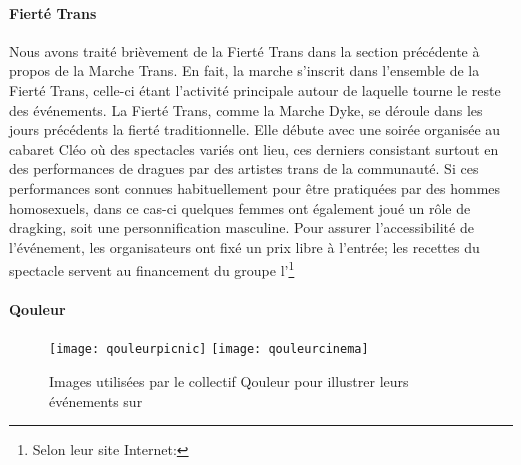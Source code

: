 \paragraph{Fierté Trans}
\label{subsec:fiertetrans}
Nous avons traité brièvement de la Fierté Trans dans la section précédente à propos de la Marche Trans.
En fait, la marche s'inscrit dans l'ensemble de la Fierté Trans, celle-ci étant l'activité principale autour de laquelle tourne le reste des événements.
La Fierté Trans, comme la Marche Dyke, se déroule dans les jours précédents la fierté traditionnelle.
Elle débute avec une soirée organisée au cabaret Cléo où des spectacles variés ont lieu, ces derniers consistant surtout en des performances de dragues par des artistes trans de la communauté.
Si ces performances sont connues habituellement pour être pratiquées par des hommes homosexuels, dans ce cas-ci quelques femmes ont également joué un rôle de dragking, soit une personnification masculine.
Pour assurer l'accessibilité de l'événement, les organisateurs ont fixé un prix libre à l'entrée; les recettes du spectacle servent au financement du groupe l'\astteq{}\footnote{Selon leur site Internet: }

\paragraph{Qouleur}
\label{subsec:qouleur}

\begin{figure}
  \centering
  {\texttt{[image: qouleurpicnic]}}
  {\texttt{[image: qouleurcinema]}}
  \caption[Exemples d'images utilisées par Qouleur]{Images utilisées par le collectif Qouleur pour illustrer leurs événements sur }\label{figs:qouleurcinema}
\end{figure}

